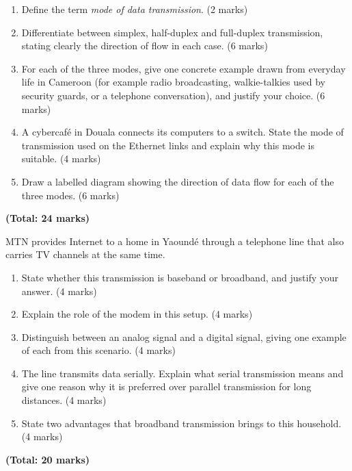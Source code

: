 \documentclass[11pt]{article}
\begin{document}
\begin{exercice}
\begin{enumerate}
\item Define the term \emph{mode of data transmission}. \hfill (2 marks)
\item Differentiate between simplex, half-duplex and full-duplex transmission, stating clearly the direction of flow in each case. \hfill (6 marks)
\item For each of the three modes, give one concrete example drawn from everyday life in Cameroon (for example radio broadcasting, walkie-talkies used by security guards, or a telephone conversation), and justify your choice. \hfill (6 marks)
\item A cybercafé in Douala connects its computers to a switch. State the mode of transmission used on the Ethernet links and explain why this mode is suitable. \hfill (4 marks)
\item Draw a labelled diagram showing the direction of data flow for each of the three modes. \hfill (6 marks)
\end{enumerate}
\hfill \textbf{(Total: 24 marks)}
\end{exercice}

\begin{exercice}
MTN provides Internet to a home in Yaoundé through a telephone line that also carries TV channels at the same time.
\begin{enumerate}
\item State whether this transmission is baseband or broadband, and justify your answer. \hfill (4 marks)
\item Explain the role of the modem in this setup. \hfill (4 marks)
\item Distinguish between an analog signal and a digital signal, giving one example of each from this scenario. \hfill (4 marks)
\item The line transmits data serially. Explain what serial transmission means and give one reason why it is preferred over parallel transmission for long distances. \hfill (4 marks)
\item State two advantages that broadband transmission brings to this household. \hfill (4 marks)
\end{enumerate}
\hfill \textbf{(Total: 20 marks)}
\end{exercice}
\end{document}
